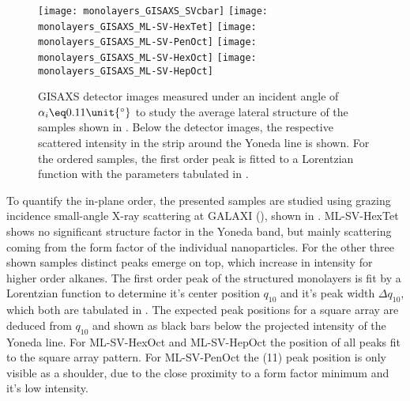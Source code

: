 \documentclass[\main/dresen_thesis.tex]{subfiles}
\begin{document}
    \begin{figure}[tb]
      \centering
      \texttt{[image: monolayers\_GISAXS\_SVcbar]}
      \texttt{[image: monolayers\_GISAXS\_ML-SV-HexTet]}
      \texttt{[image: monolayers\_GISAXS\_ML-SV-PenOct]}
      \texttt{[image: monolayers\_GISAXS\_ML-SV-HexOct]}
      \texttt{[image: monolayers\_GISAXS\_ML-SV-HepOct]}
      \caption{\label{fig:monolayers:preparation:solventVariation:gisaxs}GISAXS detector images measured under an incident angle of $\alpha_i \eq 0.11 \unit{^\circ}$ to study the average lateral structure of the samples shown in . Below the detector images, the respective scattered intensity in the strip around the Yoneda line is shown. For the ordered samples, the first order peak is fitted to a Lorentzian function with the parameters tabulated in .}
    \end{figure}

    To quantify the in-plane order, the presented samples are studied using grazing incidence small-angle X-ray scattering at GALAXI (), shown in .
    ML-SV-HexTet shows no significant structure factor in the Yoneda band, but mainly scattering coming from the form factor of the individual nanoparticles.
    For the other three shown samples distinct peaks emerge on top, which increase in intensity for higher order alkanes.
    The first order peak of the structured monolayers is fit by a Lorentzian function to determine it's center position  $q_{10}$ and it's peak width $\Delta q_{10}$, which both are tabulated in .
    The expected peak positions for a square array are deduced from $q_{10}$ and shown as black bars below the projected intensity of the Yoneda line.
    For ML-SV-HexOct and ML-SV-HepOct the position of all peaks fit to the square array pattern.
    For ML-SV-PenOct the (11) peak position is only visible as a shoulder, due to the close proximity to a form factor minimum and it's low intensity.
\end{document}
